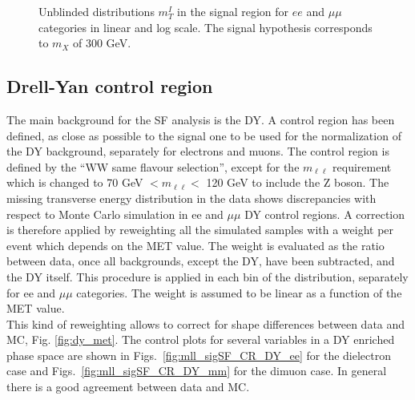 \begin{figure}[htbp]
{}
\caption{Unblinded distributions  $m_T^I$ in the signal region for $ee$ and $\mu \mu$ categories in linear and log scale. The signal hypothesis corresponds to $m_X $ of 300 GeV.}
    \label{fig:mti_sigOF_Un}
\end{figure}




\newpage

\subsection*{Drell-Yan control region}
The main background for the SF analysis is the DY. 
A control region has been defined, as close as possible to the signal one to
be used for the normalization of the DY background, separately for electrons
and muons.
The control region is defined by the ``WW same flavour selection'', except for the
$m_{\ell \ell}$ requirement which is changed to 70 GeV $ <m_{\ell \ell} <$ 120
GeV to include the Z boson.
The missing transverse energy distribution in the data shows discrepancies with respect to Monte Carlo simulation in ee and $\mu \mu$ DY control regions. A correction is therefore applied by reweighting all the simulated samples with a weight per event which depends on the MET value. 
The weight is evaluated as the ratio between data, once all backgrounds, except the DY, have been subtracted, and the DY itself. This procedure is applied in each bin of the distribution, separately for ee and $\mu \mu$ categories. The weight is assumed to be linear as a function of the MET value.\\
This kind of reweighting allows to correct for shape differences between data and MC, Fig. \ref{fig:dy_met}.
The control plots for several variables in a DY enriched phase space
are shown in Figs.~\ref{fig:mll_sigSF_CR_DY_ee} for
the dielectron case and Figs.~\ref{fig:mll_sigSF_CR_DY_mm} for the dimuon
case. In general there is a good agreement between data and MC.

